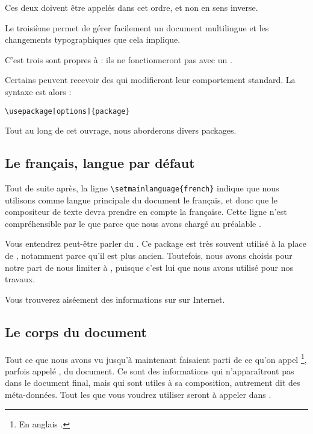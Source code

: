 \begin{attention}
Ces deux  doivent être appelés dans cet ordre, et non en sens inverse.
\end{attention}

Le troisième permet de gérer facilement un document multilingue et les changements typographiques que cela implique.

C'est trois  sont propres à  : ils ne fonctionneront pas avec un  \logiciel{\LaTeX}.

Certains  peuvent recevoir des  qui modifieront leur comportement standard. La syntaxe est alors :

\verb|\usepackage[options]{package}|

Tout au long de cet ouvrage, nous aborderons divers packages.

\subsection{Le fran\c cais, langue par défaut}

Tout de suite après, la ligne \verb|\setmainlanguage{french}| indique que nous utilisons comme langue principale du document le fran\c cais, et donc que le compositeur de texte devra prendre en compte la  fran\c caise. Cette ligne n'est compréhensible par le  que parce que nous avons chargé au préalable .

\begin{anedocte}
Vous entendrez peut-être parler du  . Ce package est très souvent utilisé à la place de , notamment parce qu'il est plus ancien. Toutefois, nous avons choisis pour notre part de nous limiter à , puisque c'est lui que nous avons utilisé pour nos travaux.

Vous trouverez aiséement des informations sur  sur Internet.

\end{anedocte}

\subsection{Le corps du document}

Tout ce que nous avons vu jusqu'à maintenant faisaient parti de ce qu'on appel \footnote{En anglais .}, parfois appelé , du document. Ce sont des informations qui n'apparaîtront pas dans le document final, mais qui sont utiles à sa composition, autrement dit des méta-données. Tout les  que vous voudrez utiliser seront à appeler dans .

